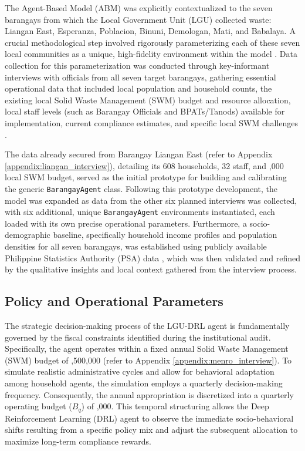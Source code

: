 The Agent-Based Model (ABM) was explicitly contextualized to the seven barangays from which the Local Government Unit (LGU) collected waste: Liangan East, Esperanza, Poblacion, Binuni, Demologan, Mati, and Babalaya. A crucial methodological step involved rigorously parameterizing each of these seven local communities as a unique, high-fidelity environment within the model \citep{Jimenez2025, Brugiere2022}. Data collection for this parameterization was conducted through key-informant interviews with officials from all seven target barangays, gathering essential operational data that included local population and household counts, the existing local Solid Waste Management (SWM) budget and resource allocation, local staff levels (such as Barangay Officials and BPATs/Tanods) available for implementation, current compliance estimates, and specific local SWM challenges \citep{Villanueva2021, Florida2023}.

The data already secured from Barangay Liangan East (refer to Appendix \ref{appendix:liangan_interview}), detailing its 608 households, 32 staff, and ,000 local SWM budget, served as the initial prototype for building and calibrating the generic \texttt{BarangayAgent} class. Following this prototype development, the model was expanded as data from the other six planned interviews was collected, with six additional, unique \texttt{BarangayAgent} environments instantiated, each loaded with its own precise operational parameters. Furthermore, a socio-demographic baseline, specifically household income profiles and population densities for all seven barangays, was established using publicly available Philippine Statistics Authority (PSA) data \citep{Abordo2025}, which was then validated and refined by the qualitative insights and local context gathered from the interview process.

\subsection{Policy and Operational Parameters}

The strategic decision-making process of the LGU-DRL agent is fundamentally governed by the fiscal constraints identified during the institutional audit. Specifically, the agent operates within a fixed annual Solid Waste Management (SWM) budget of ,500,000 (refer to Appendix \ref{appendix:menro_interview}). To simulate realistic administrative cycles and allow for behavioral adaptation among household agents, the simulation employs a quarterly decision-making frequency. Consequently, the annual appropriation is discretized into a quarterly operating budget ($B_q$) of ,000. This temporal structuring allows the Deep Reinforcement Learning (DRL) agent to observe the immediate socio-behavioral shifts resulting from a specific policy mix and adjust the subsequent allocation to maximize long-term compliance rewards.

